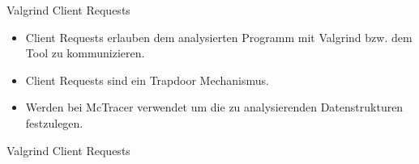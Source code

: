 \begin{frame}{Valgrind Client Requests}
	\begin{itemize}
		\item Client Requests erlauben dem analysierten Programm mit Valgrind bzw. dem Tool zu kommunizieren.
		\pause \item Client Requests sind ein Trapdoor Mechanismus.
		\pause \item Werden bei McTracer verwendet um die zu analysierenden Datenstrukturen festzulegen.
	\end{itemize}

	\pause

	\lstset{frame=single}
		
\end{frame}

\begin{frame}{Valgrind Client Requests}
	\lstset{frame=single}
		
\end{frame}
